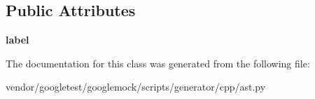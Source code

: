 \subsection*{Public Attributes}
\begin{DoxyCompactItemize}
\item 
\mbox{\label{classcpp_1_1ast_1_1_goto_a685284ea5f3b21f39aff7f5db841c8f5}} 
{\bfseries label}
\end{DoxyCompactItemize}


The documentation for this class was generated from the following file\+:\begin{DoxyCompactItemize}
\item 
vendor/googletest/googlemock/scripts/generator/cpp/ast.\+py\end{DoxyCompactItemize}
